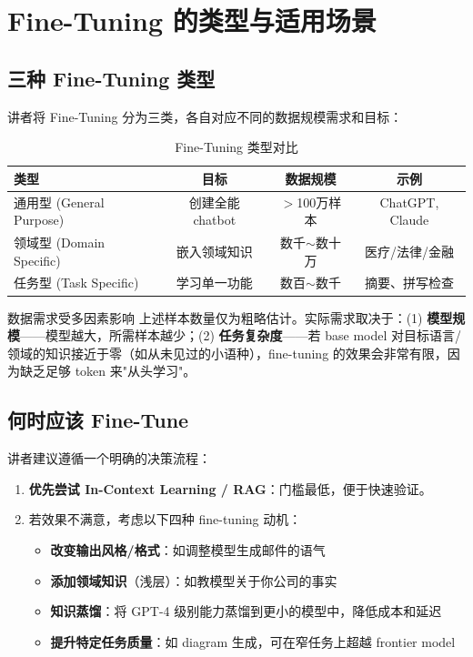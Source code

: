 \section{Fine-Tuning 的类型与适用场景}

\subsection{三种 Fine-Tuning 类型}

讲者将 Fine-Tuning 分为三类，各自对应不同的数据规模需求和目标：

\begin{table}[H]
\centering
\caption{Fine-Tuning 类型对比}
\begin{tabular}{lccc}
\toprule
\textbf{类型} & \textbf{目标} & \textbf{数据规模} & \textbf{示例} \\
\midrule
通用型 (General Purpose) & 创建全能 chatbot & $>$100万样本 & ChatGPT, Claude \\
领域型 (Domain Specific) & 嵌入领域知识 & 数千$\sim$数十万 & 医疗/法律/金融 \\
任务型 (Task Specific) & 学习单一功能 & 数百$\sim$数千 & 摘要、拼写检查 \\
\bottomrule
\end{tabular}
\end{table}

\begin{warningbox}{数据需求受多因素影响}
上述样本数量仅为粗略估计。实际需求取决于：(1) \textbf{模型规模}——模型越大，所需样本越少；(2) \textbf{任务复杂度}——若 base model 对目标语言/领域的知识接近于零（如从未见过的小语种），fine-tuning 的效果会非常有限，因为缺乏足够 token 来"从头学习"。
\end{warningbox}

\subsection{何时应该 Fine-Tune}

讲者建议遵循一个明确的决策流程：

\begin{enumerate}
    \item \textbf{优先尝试 In-Context Learning / RAG}：门槛最低，便于快速验证。
    \item 若效果不满意，考虑以下四种 fine-tuning 动机：
    \begin{itemize}
        \item \textbf{改变输出风格/格式}：如调整模型生成邮件的语气
        \item \textbf{添加领域知识}（浅层）：如教模型关于你公司的事实
        \item \textbf{知识蒸馏}：将 GPT-4 级别能力蒸馏到更小的模型中，降低成本和延迟
        \item \textbf{提升特定任务质量}：如 diagram 生成，可在窄任务上超越 frontier model
    \end{itemize}
\end{enumerate}

